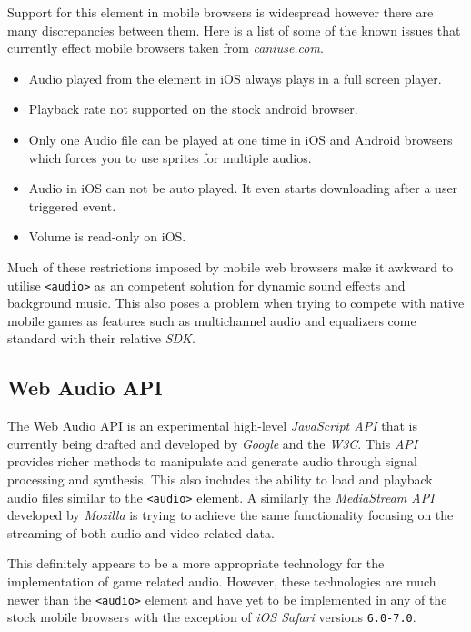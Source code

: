 \documentclass[final]{cmpreport}
\begin{document}
Support for this element in mobile browsers is widespread however there are many discrepancies between them. Here is a list of some of the known issues that currently effect mobile browsers taken from \textit{caniuse.com\footnotemark[8]}.


\begin{itemize}
  \item Audio played from the element in iOS always plays in a full screen player.
  \item Playback rate not supported on the stock android browser.
  \item Only one Audio file can be played at one time in iOS and Android browsers which forces you to use sprites for multiple audios.
  \item Audio in iOS can not be auto played. It even starts downloading after a user triggered event.
  \item Volume is read-only on iOS.
\end{itemize}

Much of these restrictions imposed by mobile web browsers make it awkward to utilise \texttt{<audio>} as an competent solution for dynamic sound effects and background music. This also poses a problem when trying to compete with native mobile games as features such as multichannel audio and equalizers come standard with their relative \textit{SDK}.

\subsection{Web Audio API}
The Web Audio API is an experimental high-level \textit{JavaScript API} that is currently being drafted and developed by \textit{Google} and the \textit{W3C\footnotemark[9]}. This \textit{API} provides richer methods to manipulate and generate audio through signal processing and synthesis. This also includes the ability to load and playback audio files similar to the \texttt{<audio>} element. A similarly the \textit{MediaStream API\footnotemark[10]} developed by \textit{Mozilla} is trying to achieve the same functionality focusing on the streaming of both audio and video related data.


This definitely appears to be a more appropriate technology for the implementation of game related audio. However, these technologies are much newer than the \texttt{<audio>} element and have yet to be implemented in any of the stock mobile browsers with the exception of \textit{iOS Safari} versions \texttt{6.0-7.0\footnotemark[11]}.
\end{document}
